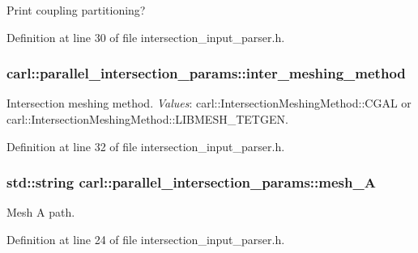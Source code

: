 Print coupling partitioning? 



Definition at line 30 of file intersection\+\_\+input\+\_\+parser.\+h.

\hypertarget{structcarl_1_1parallel__intersection__params_ab94c6f1beb1d530141758397f49d6d08}{}
\subsubsection[{inter\+\_\+meshing\+\_\+method}]{ carl\+::parallel\+\_\+intersection\+\_\+params\+::inter\+\_\+meshing\+\_\+method}\label{structcarl_1_1parallel__intersection__params_ab94c6f1beb1d530141758397f49d6d08}


Intersection meshing method. {\itshape Values}\+: carl\+::\+Intersection\+Meshing\+Method\+::\+C\+G\+A\+L or carl\+::\+Intersection\+Meshing\+Method\+::\+L\+I\+B\+M\+E\+S\+H\+\_\+\+T\+E\+T\+G\+E\+N. 



Definition at line 32 of file intersection\+\_\+input\+\_\+parser.\+h.

\hypertarget{structcarl_1_1parallel__intersection__params_aa984f7e6899406a1d17bdaa22e669e22}{}
\subsubsection[{mesh\+\_\+\+A}]{\setlength{\rightskip}{0pt plus 5cm}std\+::string carl\+::parallel\+\_\+intersection\+\_\+params\+::mesh\+\_\+\+A}\label{structcarl_1_1parallel__intersection__params_aa984f7e6899406a1d17bdaa22e669e22}


Mesh A path. 



Definition at line 24 of file intersection\+\_\+input\+\_\+parser.\+h.

\hypertarget{structcarl_1_1parallel__intersection__params_a77a1bbaf19e80f8dfd2612c2e86acb45}{}
